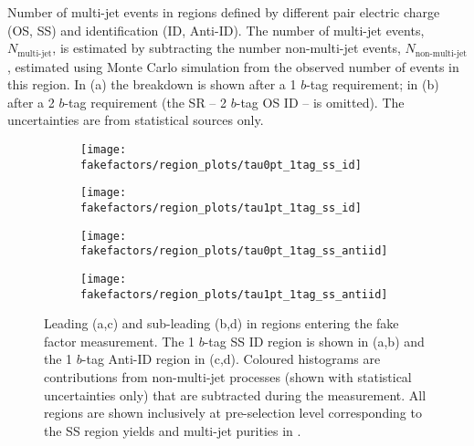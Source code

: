 \begin{table}[htbp]
  \centering

  \begin{subtable}[t]{\textwidth}
    \centering
    
    \label{tab:mjfakes_yields_1tag}
  \end{subtable}

  \begin{subtable}[t]{\textwidth}
    \centering
    
  \end{subtable}

  \caption{Number of multi-jet events in regions defined by different
    \tauhadvis pair electric charge (OS, SS) and \tauhadvis
    identification (ID, Anti-ID). The number of multi-jet events,
    $N_\text{multi-jet}$, is estimated by subtracting the number
    non-multi-jet events, $N_\text{non-multi-jet}$, estimated using
    Monte Carlo simulation from the observed number of events in this
    region. In (a) the breakdown is shown after a 1 $b$-tag
    requirement; in (b) after a 2 $b$-tag requirement (the SR -- 2
    $b$-tag OS ID -- is omitted). The uncertainties are from
    statistical sources only.}
  \label{tab:mjfakes_yields}
\end{table}


\begin{figure}[htbp]
  \centering

  \begin{subfigure}{0.49\textwidth}
    \texttt{[image: fakefactors/region\_plots/tau0pt\_1tag\_ss\_id]}
  \end{subfigure}
  \begin{subfigure}{0.49\textwidth}
    \texttt{[image: fakefactors/region\_plots/tau1pt\_1tag\_ss\_id]}
  \end{subfigure}

  \begin{subfigure}{0.49\textwidth}
    \texttt{[image: fakefactors/region\_plots/tau0pt\_1tag\_ss\_antiid]}
  \end{subfigure}
  \begin{subfigure}{0.49\textwidth}
    \texttt{[image: fakefactors/region\_plots/tau1pt\_1tag\_ss\_antiid]}
  \end{subfigure}

  \caption{Leading (a,c) and sub-leading \tauhadvis \pT (b,d) in
    regions entering the fake factor measurement. The 1 $b$-tag SS ID
    region is shown in (a,b) and the 1 $b$-tag Anti-ID region in
    (c,d). Coloured histograms are contributions from non-multi-jet
    processes (shown with statistical uncertainties only) that are
    subtracted during the measurement. All regions are shown
    inclusively at pre-selection level corresponding to the SS region
    yields and multi-jet purities in .}
  \label{fig:mjfakes_1tag_ss_plots}
\end{figure}

